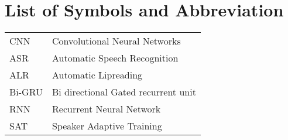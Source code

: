 				\chapter*{List of Symbols and Abbreviation}
			\endgroup
		\normalsize
		\begin{tabular}{p{1in}p{3in}}
		 CNN & Convolutional Neural Networks\\
		 ASR & Automatic Speech Recognition\\
		 ALR & Automatic Lipreading\\
		 Bi-GRU & Bi directional Gated recurrent unit\\
		 RNN & Recurrent Neural Network\\
		 SAT & Speaker Adaptive Training
		 
		\end{tabular}
		\break
		\pagebreak